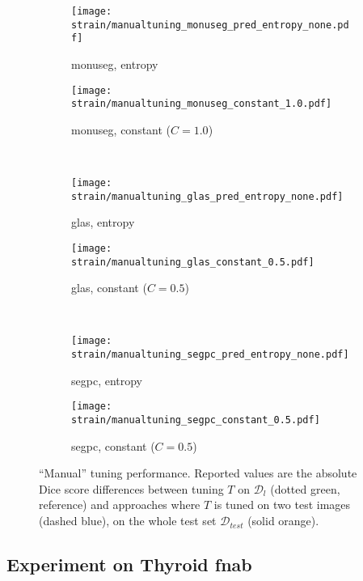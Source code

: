 \begin{figure}
  \centering
  \begin{subfigure}{0.48\textwidth}
    \centering
    \texttt{[image: strain/manualtuning\_monuseg\_pred\_entropy\_none.pdf]}
    \caption{\acrshort{monuseg}, entropy}
    \label{sfig:strain:manual:monu_entropy}
  \end{subfigure}
  \begin{subfigure}{0.48\textwidth}
    \centering
    \texttt{[image: strain/manualtuning\_monuseg\_constant\_1.0.pdf]}
    \caption{\acrshort{monuseg}, constant ($C=1.0$)}
    \label{sfig:strain:manual:monu_constant}
  \end{subfigure} \\
  \begin{subfigure}{0.48\textwidth}
    \centering
    \texttt{[image: strain/manualtuning\_glas\_pred\_entropy\_none.pdf]}
    \caption{\acrshort{glas}, entropy}
    \label{sfig:strain:manual:_glas_pred_entropy_none}
  \end{subfigure}
  \begin{subfigure}{0.48\textwidth}
    \centering
    \texttt{[image: strain/manualtuning\_glas\_constant\_0.5.pdf]}
    \caption{\acrshort{glas}, constant ($C=0.5$)}
    \label{sfig:strain:manual:_glas_constant}
  \end{subfigure} \\
  \begin{subfigure}{0.48\textwidth}
    \centering
    \texttt{[image: strain/manualtuning\_segpc\_pred\_entropy\_none.pdf]}
    \caption{\acrshort{segpc}, entropy}
    \label{sfig:strain:manual:_segpc_pred_entropy_none}
  \end{subfigure}
  \begin{subfigure}{0.48\textwidth}
    \centering
    \texttt{[image: strain/manualtuning\_segpc\_constant\_0.5.pdf]}
    \caption{\acrshort{segpc}, constant ($C=0.5$)}
    \label{sfig:strain:manual:_segpc_constant}
  \end{subfigure}
  \caption{``Manual'' tuning performance. Reported values are the absolute Dice score differences between tuning $T$ on $\mathcal{D}_l$ (dotted green, reference) and approaches where $T$ is tuned on two test images (dashed blue), on the whole test set $\mathcal{D}_{test}$ (solid orange).}
  \label{fig:strain:manualtuning}

\end{figure}


\subsection{Experiment on Thyroid \acrshort{fnab}}
\label{ssec:strain:thyroid_exp}

